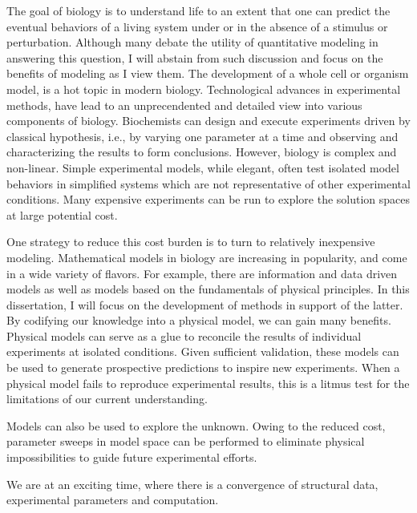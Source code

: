 
\par The goal of biology is to understand life to an extent that one can predict the eventual behaviors of a living system under or in the absence of a stimulus or perturbation.
Although many debate the utility of quantitative modeling in answering this question, I will abstain from such discussion and focus on the benefits of modeling as I view them.
The development of a whole cell or organism model, is a hot topic in modern biology.
Technological advances in experimental methods, have lead to an unprecendented and detailed view into various components of biology.
Biochemists can design and execute experiments driven by classical hypothesis, i.e., by varying one parameter at a time and observing and characterizing the results to form conclusions.
However, biology is complex and non-linear.
Simple experimental models, while elegant, often test isolated model behaviors in simplified systems which are not representative of other experimental conditions.
Many expensive experiments can be run to explore the solution spaces at large potential cost.

\par One strategy to reduce this cost burden is to turn to relatively inexpensive modeling.
Mathematical models in biology are increasing in popularity, and come in a wide variety of flavors\cite{Gunawardena2014}.
For example, there are information and data driven models as well as models based on the fundamentals of physical principles.
In this dissertation, I will focus on the development of methods in support of the latter.
By codifying our knowledge into a physical model, we can gain many benefits.
Physical models can serve as a glue to reconcile the results of individual experiments at isolated conditions.
Given sufficient validation, these models can be used to generate prospective predictions to inspire new experiments.
When a physical model fails to reproduce experimental results, this is a litmus test for the limitations of our current understanding.


Models can also be used to explore the unknown.
Owing to the reduced cost, parameter sweeps in model space can be performed to eliminate physical impossibilities to guide future experimental efforts.


We are at an exciting time, where there is a convergence of structural data, experimental parameters and computation.

